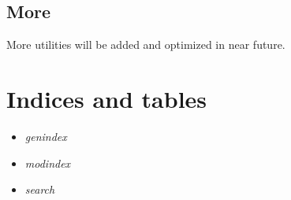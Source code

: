 \documentclass[letterpaper,10pt,english]{sphinxmanual}
\begin{document}
\section{More}
\label{diagnosis:more}
More utilities will be added and optimized in near future.


\chapter{Indices and tables}
\label{index:indices-and-tables}\begin{itemize}
\item {} 
\emph{genindex}

\item {} 
\emph{modindex}

\item {} 
\emph{search}

\end{itemize}
\end{document}
